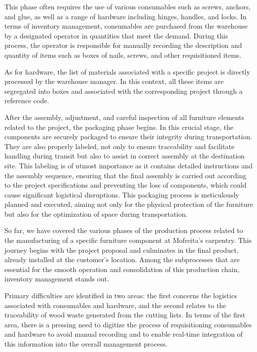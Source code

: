 This phase often requires the use of various consumables such as screws, anchors, and glue, as well as a range of hardware including hinges, handles, and locks. In terms of inventory management, consumables are purchased from the warehouse by a designated operator in quantities that meet the demand. During this process, the operator is responsible for manually recording the description and quantity of items such as boxes of nails, screws, and other requisitioned items.

As for hardware, the list of materials associated with a specific project is directly processed by the warehouse manager. In this context, all these items are segregated into boxes and associated with the corresponding project through a reference code.

After the assembly, adjustment, and careful inspection of all furniture elements related to the project, the packaging phase begins. In this crucial stage, the components are securely packaged to ensure their integrity during transportation. They are also properly labeled, not only to ensure traceability and facilitate handling during transit but also to assist in correct assembly at the destination site. This labeling is of utmost importance as it contains detailed instructions and the assembly sequence, ensuring that the final assembly is carried out according to the project specifications and preventing the loss of components, which could cause significant logistical disruptions. This packaging process is meticulously planned and executed, aiming not only for the physical protection of the furniture but also for the optimization of space during transportation.

So far, we have covered the various phases of the production process related to the manufacturing of a specific furniture component at Mofreita's carpentry. This journey begins with the project proposal and culminates in the final product, already installed at the customer's location. Among the subprocesses that are essential for the smooth operation and consolidation of this production chain, inventory management stands out.

Primary difficulties are identified in two areas: the first concerns the logistics associated with consumables and hardware, and the second relates to the traceability of wood waste generated from the cutting lists. In terms of the first area, there is a pressing need to digitize the process of requisitioning consumables and hardware to avoid manual recording and to enable real-time integration of this information into the overall management process.

